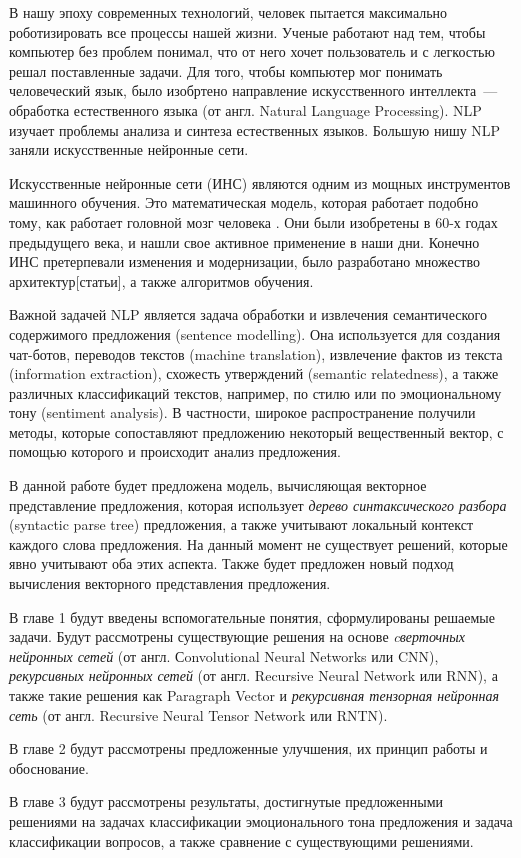 \startprefacepage
В нашу эпоху современных технологий, человек пытается максимально
роботизировать все процессы нашей жизни. Ученые работают над тем,
чтобы компьютер без проблем понимал, что от него хочет пользователь и с легкостью
решал поставленные задачи. 
Для того, чтобы компьютер мог понимать человеческий язык, было изобртено направление искусственного интеллекта~--- обработка естественного языка (от англ. Natural Language Processing). 
NLP изучает проблемы анализа и синтеза естественных языков\cite{wikinlp}.
Большую нишу NLP заняли искусственные нейронные сети.

Искусственные нейронные сети (ИНС) являются одним из мощных инструментов машинного
обучения.
Это математическая модель, которая работает подобно тому, как работает головной
мозг человека \cite{rosenblatt58a}.
Они были изобретены в 60-х годах предыдущего века, и нашли свое активное
применение в наши дни. Конечно ИНС претерпевали изменения и модернизации, было разработано множество архитектур[статьи], а также алгоритмов обучения\cite{Duchi2011, zeiler2012, rprop93}.

Важной задачей NLP является задача  обработки и 
извлечения семантического содержимого предложения (sentence modelling).
Она используется для создания чат-ботов, переводов текстов (machine translation), 
извлечение фактов из текста (information extraction), схожесть утверждений (semantic relatedness), 
а также различных классификаций текстов, например, по стилю или по эмоциональному тону (sentiment analysis).
В частности, широкое распространение получили методы, 
которые сопоставляют предложению некоторый вещественный вектор, 
с помощью которого и происходит анализ предложения.

В данной работе будет предложена модель, вычисляющая векторное представление предложения, 
которая использует \emph{дерево синтаксического разбора} (syntactic parse tree) предложения, а также учитывают локальный контекст каждого слова предложения.
На данный момент не существует решений, которые явно учитывают оба этих аспекта.
Также будет предложен новый подход вычисления векторного представления предложения.

В главе 1 будут введены вспомогательные понятия, сформулированы решаемые задачи.
Будут рассмотрены существующие решения на основе \emph{cверточных нейронных сетей} (от англ. Сonvolutional Neural Networks или CNN), \emph{рекурсивных нейронных сетей} (от англ. Recursive Neural Network или RNN), а также такие решения как Paragraph Vector и \emph{рекурсивная тензорная нейронная сеть} (от англ. Recursive Neural Tensor Network или RNTN).

В главе 2 будут рассмотрены предложенные улучшения, их принцип работы и обоснование.

В главе 3 будут рассмотрены результаты, достигнутые предложенными решениями на задачах классификации
эмоционального тона предложения и задача классификации вопросов, а также сравнение с существующими решениями.